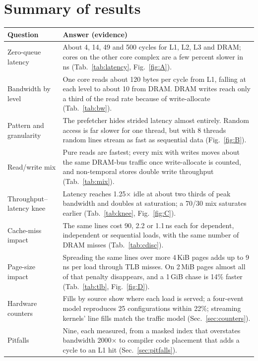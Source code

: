 \documentclass{article}
\begin{document}
\section{Summary of results}\label{sec:summary}
{\small
\begin{tabular}{p{3.8cm}p{12.2cm}}
\toprule
\textbf{Question} & \textbf{Answer (evidence)} \\
\midrule
Zero-queue latency & About 4, 14, 49 and 500 cycles for L1, L2, L3 and DRAM; cores on the other core complex are a few percent slower in ns (Tab.~\ref{tab:latency}, Fig.~\ref{fig:A}). \\
Bandwidth by level & One core reads about 120 bytes per cycle from L1, falling at each level to about 10 from DRAM. DRAM writes reach only a third of the read rate because of write-allocate (Tab.~\ref{tab:bw}). \\
Pattern and granularity & The prefetcher hides strided latency almost entirely. Random access is far slower for one thread, but with 8 threads random lines stream as fast as sequential data (Fig.~\ref{fig:B}). \\
Read/write mix & Pure reads are fastest; every mix with writes moves about the same DRAM-bus traffic once write-allocate is counted, and non-temporal stores double write throughput (Tab.~\ref{tab:mix}). \\
Throughput--latency knee & Latency reaches 1.25$\times$ idle at about two thirds of peak bandwidth and doubles at saturation; a 70/30 mix saturates earlier (Tab.~\ref{tab:knee}, Fig.~\ref{fig:C}). \\
Cache-miss impact & The same lines cost 90, 2.2 or 1.1\,ns each for dependent, independent or sequential loads, with the same number of DRAM misses (Tab.~\ref{tab:cdisc}). \\
Page-size impact & Spreading the same lines over more 4\,KiB pages adds up to 9\,ns per load through TLB misses. On 2\,MiB pages almost all of that penalty disappears, and a 1\,GiB chase is 14\% faster (Tab.~\ref{tab:tlb}, Fig.~\ref{fig:D}). \\
Hardware counters & Fills by source show where each load is served; a four-event model reproduces 25 configurations within 22\%; streaming kernels' line fills match the traffic model (Sec.~\ref{sec:counters}). \\
Pitfalls & Nine, each measured, from a masked index that overstates bandwidth 2000$\times$ to compiler code placement that adds a cycle to an L1 hit (Sec.~\ref{sec:pitfalls}). \\
\bottomrule
\end{tabular}
}
\end{document}
